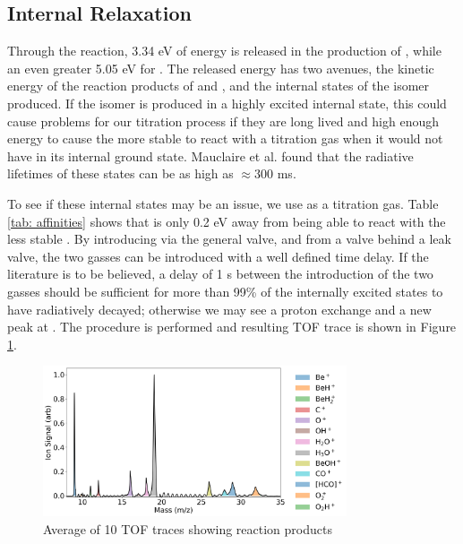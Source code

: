 \subsection{Internal Relaxation}

Through the  reaction, 3.34 eV of energy is released in the production of , while an even greater 5.05 eV for . The released energy has two avenues, the kinetic energy of the reaction products of \ce{[HCO]+} and , and the internal states of the isomer produced. If the isomer is produced in a highly excited internal state, this could cause problems for our titration process if they are long lived and high enough energy to cause the more stable  to react with a titration gas  when it would not have in its internal ground state. Mauclaire et al. found that the radiative lifetimes of these states can be as high as $\approx 300$ ms.\cite{Mauclaire1995}

To see if these internal states may be an issue, we use  as a titration gas. Table \ref{tab: affinities} shows that  is only 0.2 eV away from being able to react with the less stable . By introducing  via the general valve, and  from a valve behind a leak valve, the two gasses can be introduced with a well defined time delay. If the literature is to be believed, a delay of 1 s between the introduction of the two gasses should be sufficient for more than 99\% of the internally excited states to have radiatively decayed; otherwise we may see a proton exchange and a new peak at . The procedure is performed and resulting TOF trace is shown in Figure \ref{fig: O2 titration}.

\begin{figure}
	\centering
	\includegraphics[width=0.8\textwidth]{images/O2_titration.png}
	\caption{Average of 10 TOF traces showing reaction products}
	\label{fig: O2 titration}
\end{figure}

